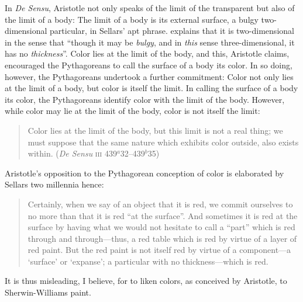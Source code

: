 In \emph{De Sensu}, Aristotle not only speaks of the limit of the transparent but also of the limit of a body: The limit of a body is its external surface, a bulgy two-dimensional particular, in Sellars' \citeyearpar[\textsc{iv} §23]{Sellars:1956xp} apt phrase. \citet[\textsc{iv} §23]{Sellars:1956xp} explains that it is two-dimensional in the sense that ``though it may be \emph{bulgy}, and in \emph{this} sense three-dimensional, it has no \emph{thickness}''. Color lies at the limit of the body, and this, Aristotle claims, encouraged the Pythagoreans to call the surface of a body its color. In so doing, however, the Pythagoreans undertook a further commitment: Color not only lies at the limit of a body, but color is itself the limit. In calling the surface of a body its color, the Pythagoreans identify color with the limit of the body. However, while color may lie at the limit of the body, color is not itself the limit:
\begin{quote}
	Color lies at the limit of the body, but this limit is not a real thing; we must suppose that the same nature which exhibits color outside, also exists within. (\emph{De Sensu} \textsc{iii} 439\( ^{a} \)32--439\( ^{b} \)35)
\end{quote}
Aristotle's opposition to the Pythagorean conception of color is elaborated by Sellars two millennia hence:
\begin{quote}
	Certainly, when we say of an object that it is red, we commit ourselves to no more than that it is red ``at the surface''. And sometimes it is red at the surface by having what we would not hesitate to call a ``part'' which is red through and through---thus, a red table which is red by virtue of a layer of red paint. But the red paint is not itself red by virtue of a component---a `surface' or `expanse'; a particular with no thickness---which is red. \citep[\textsc{iv} §23]{Sellars:1956xp}
\end{quote}
It is thus misleading, I believe, for \citet{Silverman:1989ve} to liken colors, as conceived by Aristotle, to Sherwin-Williams paint.

